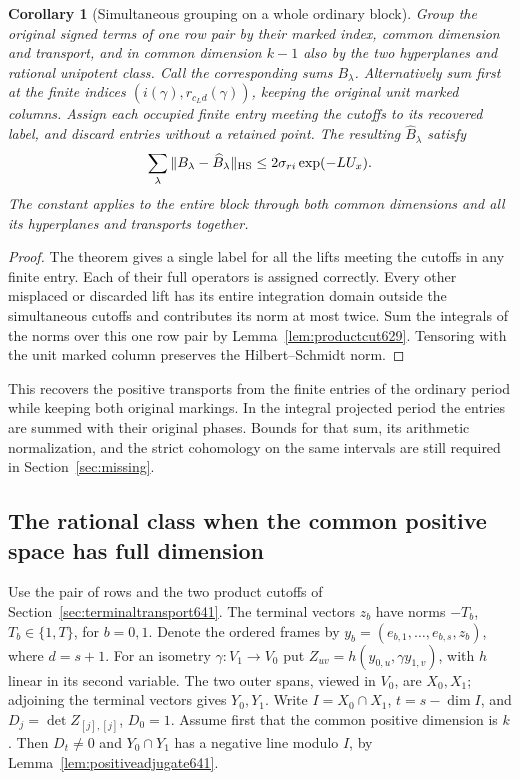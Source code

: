 \documentclass[a4paper,11pt]{article}
\newtheorem{corollary}[proposition]{Corollary}
\theoremstyle{definition}
\theoremstyle{remark}
\numberwithin{equation}{section}
\begin{document}
\begin{corollary}[Simultaneous grouping on a whole ordinary block]
\leavevmode\label{cor:allterminalcoeff641}
Group the original signed terms of one row pair by their marked
index, common dimension and transport, and in common dimension
\(k-1\) also by the two hyperplanes and rational unipotent
class. Call the corresponding sums \(B_\lambda\). Alternatively
sum first at the finite indices \((i(\gamma),r_{c_Ld}(\gamma))\),
keeping the original unit marked columns. Assign each occupied
finite entry meeting the cutoffs to its recovered label, and
discard entries without a retained point. The resulting
\(\widehat B_\lambda\) satisfy
\[
       \sum_\lambda\|B_\lambda-\widehat B_\lambda\|_{\rm HS}
                             \le 2\sigma_{ri}\exp(-LU_x).
\]
The constant applies to the entire block through both common
dimensions and all its hyperplanes and transports together.
\end{corollary}
\begin{proof}
The theorem gives a single label for all the lifts meeting the
cutoffs in any finite entry. Each of their full operators is
assigned correctly. Every other misplaced or discarded lift
has its entire integration domain outside the simultaneous
cutoffs and contributes its norm at most twice. Sum the
integrals of the norms over this one row pair by
Lemma~\ref{lem:productcut629}. Tensoring with the unit marked
column preserves the Hilbert--Schmidt norm.
\end{proof}

This recovers the positive transports from the finite entries
of the ordinary period while keeping both original markings.
In the integral projected period the entries are summed with
their original phases. Bounds for that sum, its arithmetic
normalization, and the strict cohomology on the same intervals
are still required in Section~\ref{sec:missing}.


\subsection{The rational class when the common positive space has full dimension}
\label{sec:fullrationalclass645}

Use the pair of rows and the two product cutoffs of
Section~\ref{sec:terminaltransport641}. The terminal vectors
\(z_b\) have norms \(-T_b\), \(T_b\in\{1,T\}\), for \(b=0,1\).
Denote the ordered frames by \(y_b=(e_{b,1},\ldots,e_{b,s},z_b)\),
where \(d=s+1\). For an isometry \(\gamma:V_1\to V_0\) put
\(Z_{uv}=h(y_{0,u},\gamma y_{1,v})\), with \(h\) linear in its
second variable. The two outer spans, viewed in \(V_0\), are
\(X_0,X_1\); adjoining the terminal vectors gives \(Y_0,Y_1\).
Write \(I=X_0\cap X_1\), \(t=s-\dim I\), and \(D_j=\det
Z_{[j],[j]}\), \(D_0=1\). Assume first that the common positive
dimension is \(k\). Then \(D_t\ne0\) and \(Y_0\cap Y_1\)
has a negative line modulo \(I\), by
Lemma~\ref{lem:positiveadjugate641}.
\end{document}
